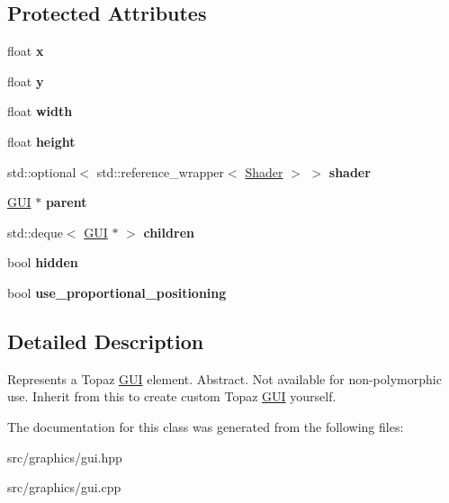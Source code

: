 \subsection*{Protected Attributes}
\begin{DoxyCompactItemize}
\item 
\mbox{\label{class_g_u_i_a7fa193a8ffb27bbb3bcc225e36f6d54d}} 
float {\bfseries x}
\item 
\mbox{\label{class_g_u_i_a98f204f99ffc5ff6cffc9340bbb8c29b}} 
float {\bfseries y}
\item 
\mbox{\label{class_g_u_i_aee5d8766834f6f743f0d8b8c16e47155}} 
float {\bfseries width}
\item 
\mbox{\label{class_g_u_i_a70b578c36323a45cac88ccff3bced933}} 
float {\bfseries height}
\item 
\mbox{\label{class_g_u_i_a64b007b31d0ec8a8704f9ab3bb2a7d3d}} 
std\+::optional$<$ std\+::reference\+\_\+wrapper$<$ \mbox{\hyperlink{class_shader}{Shader}} $>$ $>$ {\bfseries shader}
\item 
\mbox{\label{class_g_u_i_ac9c33263556b3c9997f9c7b360f06a93}} 
\mbox{\hyperlink{class_g_u_i}{G\+UI}} $\ast$ {\bfseries parent}
\item 
\mbox{\label{class_g_u_i_a2ff82067e32c06d5ba9b6aa4d860666a}} 
std\+::deque$<$ \mbox{\hyperlink{class_g_u_i}{G\+UI}} $\ast$ $>$ {\bfseries children}
\item 
\mbox{\label{class_g_u_i_a270e03faf2f4612883700dc89ec7e0d0}} 
bool {\bfseries hidden}
\item 
\mbox{\label{class_g_u_i_a6b75b1bd88f2e04e919a4a9f2333f634}} 
bool {\bfseries use\+\_\+proportional\+\_\+positioning}
\end{DoxyCompactItemize}


\subsection{Detailed Description}
Represents a Topaz \mbox{\hyperlink{class_g_u_i}{G\+UI}} element. Abstract. Not available for non-\/polymorphic use. Inherit from this to create custom Topaz \mbox{\hyperlink{class_g_u_i}{G\+UI}} yourself. 

The documentation for this class was generated from the following files\+:\begin{DoxyCompactItemize}
\item 
src/graphics/gui.\+hpp\item 
src/graphics/gui.\+cpp\end{DoxyCompactItemize}
